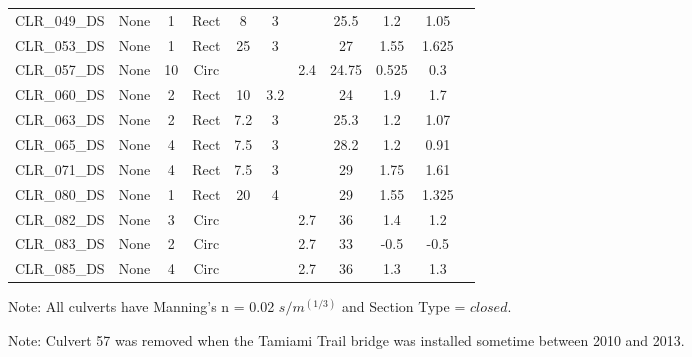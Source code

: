 \begin{table}[]
\begin{tabular}{@{}lcccccccccc@{}}
CLR\_049\_DS  & None       & 1        & Rect & 8      & 3     &          & 25.5   & 1.2       & 1.05       \\
CLR\_053\_DS  & None       & 1        & Rect & 25     & 3     &          & 27     & 1.55      & 1.625      \\
CLR\_057\_DS  & None       & 10       & Circ &        &       & 2.4      & 24.75  & 0.525     & 0.3        \\
CLR\_060\_DS  & None       & 2        & Rect & 10     & 3.2   &          & 24     & 1.9       & 1.7        \\
CLR\_063\_DS  & None       & 2        & Rect & 7.2    & 3     &          & 25.3   & 1.2       & 1.07       \\
CLR\_065\_DS  & None       & 4        & Rect & 7.5    & 3     &          & 28.2   & 1.2       & 0.91       \\
CLR\_071\_DS  & None       & 4        & Rect & 7.5    & 3     &          & 29     & 1.75      & 1.61       \\
CLR\_080\_DS  & None       & 1        & Rect & 20     & 4     &          & 29     & 1.55      & 1.325      \\
CLR\_082\_DS  & None       & 3        & Circ &        &       & 2.7      & 36     & 1.4       & 1.2        \\
CLR\_083\_DS  & None       & 2        & Circ &        &       & 2.7      & 33     & -0.5      & -0.5       \\
CLR\_085\_DS  & None       & 4        & Circ &        &       & 2.7      & 36     & 1.3       & 1.3        \\
\bottomrule
\end{tabular}
Note: All culverts have Manning's n = 0.02 $s/m^{(1/3)}$ and Section Type = $closed$.

Note: Culvert 57 was removed when the Tamiami Trail bridge was installed sometime between 2010 and 2013.
\end{table}
\clearpage

